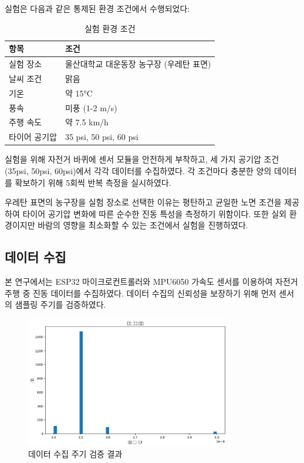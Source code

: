 \documentclass[12pt,a4paper]{article}
\begin{document}
실험은 다음과 같은 통제된 환경 조건에서 수행되었다:

\begin{table}[H]
    \centering
    \caption{실험 환경 조건}
    \label{tab:experimental_conditions}
    \begin{tabular}{@{}ll@{}}
        \toprule
        \textbf{항목} & \textbf{조건} \\
        \midrule
        실험 장소 & 울산대학교 대운동장 농구장 (우레탄 표면) \\
        날씨 조건 & 맑음 \\
        기온 & 약 15°C \\
        풍속 & 미풍 (1-2 m/s) \\
        주행 속도 & 약 7.5 km/h \\
        타이어 공기압 & 35 psi, 50 psi, 60 psi \\
        \bottomrule
    \end{tabular}
\end{table}

실험을 위해 자전거 바퀴에 센서 모듈을 안전하게 부착하고, 세 가지 공기압 조건(35psi, 50psi, 60psi)에서 각각 데이터를 수집하였다. 각 조건마다 충분한 양의 데이터를 확보하기 위해 5회씩 반복 측정을 실시하였다.

우레탄 표면의 농구장을 실험 장소로 선택한 이유는 평탄하고 균일한 노면 조건을 제공하여 타이어 공기압 변화에 따른 순수한 진동 특성을 측정하기 위함이다. 또한 실외 환경이지만 바람의 영향을 최소화할 수 있는 조건에서 실험을 진행하였다.


\subsection{데이터 수집}
\label{subsec:data_collection}

본 연구에서는 ESP32 마이크로컨트롤러와 MPU6050 가속도 센서를 이용하여 자전거 주행 중 진동 데이터를 수집하였다. 데이터 수집의 신뢰성을 보장하기 위해 먼저 센서의 샘플링 주기를 검증하였다.

\begin{figure}[H]
    \centering
    \includegraphics[width=0.8\textwidth]{images/수집주기.png}
    \caption{데이터 수집 주기 검증 결과}
    \label{fig:sampling_period}
\end{figure}
\end{document}
